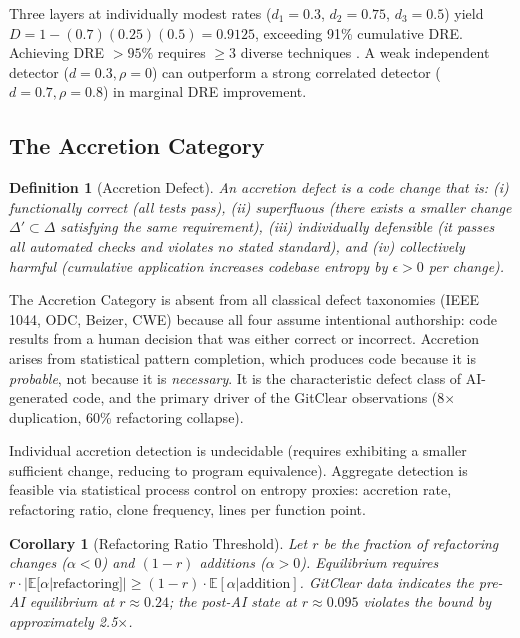 \documentclass[11pt, a4paper, logo, copyright]{googledeepmind}
\newtheorem{definition}{Definition}[section]
\newtheorem{corollary}{Corollary}[section]
\begin{document}
Three layers at individually modest rates ($d_1 = 0.3$, $d_2 = 0.75$, $d_3 = 0.5$) yield $D = 1 - (0.7)(0.25)(0.5) = 0.9125$, exceeding 91\% cumulative DRE. Achieving DRE $> 95\%$ requires $\geq 3$ diverse techniques \citep{capersjones2012}. A weak independent detector ($d = 0.3, \rho = 0$) can outperform a strong correlated detector ($d = 0.7, \rho = 0.8$) in marginal DRE improvement.

\subsection{The Accretion Category}

\begin{definition}[Accretion Defect]
\label{def:accretion}
An \emph{accretion defect} is a code change that is: (i) functionally correct (all tests pass), (ii) superfluous (there exists a smaller change $\Delta' \subset \Delta$ satisfying the same requirement), (iii) individually defensible (it passes all automated checks and violates no stated standard), and (iv) collectively harmful (cumulative application increases codebase entropy by $\epsilon > 0$ per change).
\end{definition}

The Accretion Category is absent from all classical defect taxonomies (IEEE 1044, ODC, Beizer, CWE) because all four assume intentional authorship: code results from a human decision that was either correct or incorrect. Accretion arises from statistical pattern completion, which produces code because it is \emph{probable}, not because it is \emph{necessary}. It is the characteristic defect class of AI-generated code, and the primary driver of the GitClear observations (8$\times$ duplication, 60\% refactoring collapse).

Individual accretion detection is undecidable (requires exhibiting a smaller sufficient change, reducing to program equivalence). Aggregate detection is feasible via statistical process control on entropy proxies: accretion rate, refactoring ratio, clone frequency, lines per function point.

\begin{corollary}[Refactoring Ratio Threshold]
\label{cor:refactoring}
Let $r$ be the fraction of refactoring changes ($\alpha < 0$) and $(1-r)$ additions ($\alpha > 0$). Equilibrium requires $r \cdot |\mathbb{E}[\alpha | \text{refactoring}]| \geq (1-r) \cdot \mathbb{E}[\alpha | \text{addition}]$. GitClear data indicates the pre-AI equilibrium at $r \approx 0.24$; the post-AI state at $r \approx 0.095$ violates the bound by approximately 2.5$\times$.
\end{corollary}
\end{document}
